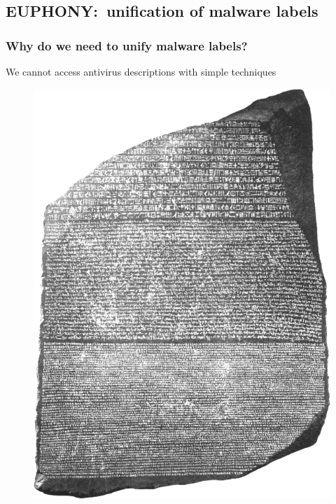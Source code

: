 \subsection[EUPHONY]{EUPHONY:~unification of malware labels}

\begin{frame}
    \frametitle{Why do we need to unify malware labels?}
    \centering

    We cannot access antivirus descriptions with simple techniques

    \vspace{-10pt}

    \begin{table}[!ht]
        \resizebox{\textwidth}{!}{
            \textit{
                
            }
        }
    \end{table}

    \vspace{-10pt}

    \begin{figure}[!ht]
        \includegraphics[height=0.65\textheight]{figures/euphony/rosette.png}
    \end{figure}

\end{frame}

